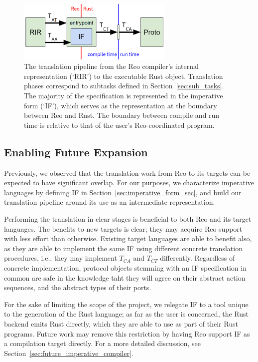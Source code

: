 \begin{figure}
	\centering
	\includegraphics[width=0.67\textwidth]{pipeline.png}
	\caption[Reo to Rust code generation pipeline.]{The translation pipeline from the Reo compiler's internal representation (`RIR') to the executable Rust  object. Translation phases correspond to subtasks defined in Section~\ref{sec:sub_tasks}. The majority of the specification is represented in the imperative form (`IF'), which serves as the representation at the boundary between Reo and Rust. The boundary between compile and run time is relative to that of the user's Reo-coordinated program.}
	\label{fig:pipeline}
\end{figure}

\subsection{Enabling Future Expansion}
Previously, we observed that the translation work from Reo to its targets can be expected to have significant overlap. For our purposes, we characterize imperative languages by defining IF in Section~\ref{sec:imperative_form_sec}, and build our translation pipeline around its use as an intermediate representation.

Performing the translation in clear stages is beneficial to both Reo and its target languages. The benefits to new targets is clear; they may acquire Reo support with less effort than otherwise. Existing target languages are able to benefit also, as they are able to implement the same IF using different concrete translation procedures, i.e., they may implement $T_{CA}$ and $T_{CT}$ differently. Regardless of concrete implementation, protocol objects stemming with an IF specification in common are safe in the knowledge taht they will agree on their abstract action sequences, and the abstract types of their ports.

For the sake of limiting the scope of the project, we relegate IF to a tool unique to the generation of the Rust language; as far as the user is concerned, the Rust backend emits Rust directly, which they are able to use as part of their Rust programs. Future work may remove this restriction by having Reo support IF as a compilation target directly. For a more detailed discussion, see Section~\ref{sec:future_imperative_compiler}.

